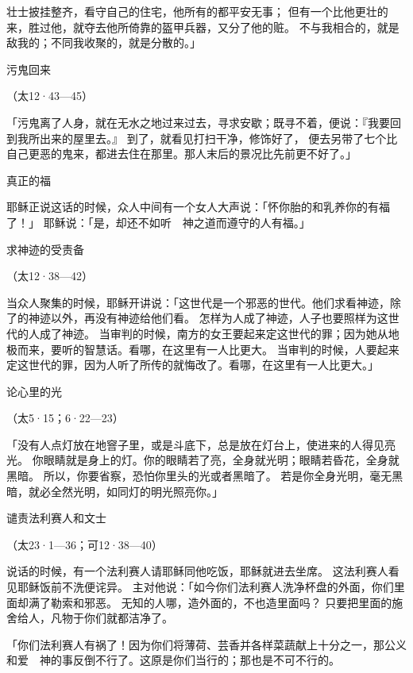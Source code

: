 {壮士披挂整齐，看守自己的住宅，他所有的都平安无事；
但有一个比他更壮的来，胜过他，就夺去他所倚靠的盔甲兵器，又分了他的赃。
不与我相合的，就是敌我的；不同我收聚的，就是分散的。」
\par }{\SH 污鬼回来
\par }{\R （太12·43—45）
\par }{\PP {}「污鬼离了人身，就在无水之地过来过去，寻求安歇{}；既寻不着，便说：『我要回到我所出来的屋里去。』
到了，就看见{}打扫干净，修饰好了，
便去另带了七个比自己更恶的鬼来，都进去住在那里。那人末后的景况比先前更不好了。」
\par }{\SH 真正的福
\par }{\PP {}耶稣正说这话的时候，众人中间有一个女人大声说：「怀你胎的和乳养你的有福了！」
耶稣说：「是，却还不如听　神之道而遵守的人有福。」
\par }{\SH 求神迹的受责备
\par }{\R （太12·38—42）
\par }{\PP {}当众人聚集的时候，耶稣开讲说：「这世代是一个邪恶的世代。他们求看神迹，除了{}的神迹以外，再没有神迹给他们看。
怎样为{}人成了神迹，人子也要照样为这世代的人成了神迹。
当审判的时候，南方的女王要起来定这世代的罪；因为她从地极而来，要听{}的智慧话。看哪，在这里有一人比{}更大。
当审判的时候，{}人要起来定这世代的罪，因为{}人听了{}所传的就悔改了。看哪，在这里有一人比{}更大。」
\par }{\SH 论心里的光
\par }{\R （太5·15；6·22—23）
\par }{\PP {}「没有人点灯放在地窨子里，或是斗底下，总是放在灯台上，使进来的人得见亮光。
你眼睛就是身上的灯。你的眼睛若了亮，全身就光明；眼睛若昏花，全身就黑暗。
所以，你要省察，恐怕你里头的光或者黑暗了。
若是你全身光明，毫无黑暗，就必全然光明，如同灯的明光照亮你。」
\par }{\SH 谴责法利赛人和文士
\par }{\R （太23·1—36；可12·38—40）
\par }{\PP {}说话的时候，有一个法利赛人请耶稣同他吃饭，耶稣就进去坐席。
这法利赛人看见耶稣饭前不洗{}便诧异。
主对他说：「如今你们法利赛人洗净杯盘的外面，你们里面却满了勒索和邪恶。
无知的人哪，造外面的，不也造里面吗？
只要把里面的施舍给人，凡物于你们就都洁净了。
\par }{\PP {}「你们法利赛人有祸了！因为你们将薄荷、芸香并各样菜蔬献上十分之一，那公义和爱　神的事反倒不行了。这原是你们当行的；那也是不可不行的。
}
